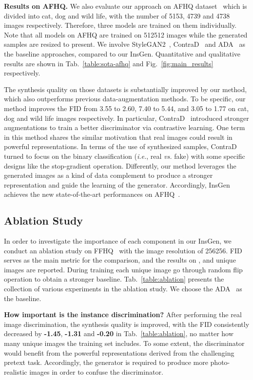 \documentclass{article}
\begin{document}
\noindent\textbf{Results on AFHQ.}
We also evaluate our approach on AFHQ dataset~\cite{choi2020starganv2} which is divided into cat, dog and wild life, with the number of 5153, 4739 and 4738 images respectively. Therefore, three models are trained on them individually. Note that all models on AFHQ are trained on 512512 images while the generated samples are resized to present. We involve StyleGAN2~\cite{Karras2019stylegan2}, ContraD~\cite{jeong2021training} and ADA~\cite{karras2020training} as the baseline approaches, compared to our InsGen.  Quantitative and qualitative results are shown in Tab.~\ref{table:sota-afhq} and Fig.~\ref{fig:main_results} respectively.


The synthesis quality on those datasets is substantially improved by our method, which also outperforms previous data-augmentation methods. To be specific, our method improves the FID from 3.55 to 2.60, 7.40 to 5.44, and 3.05 to 1.77 on cat, dog and wild life images  respectively. In particular, ContraD~\cite{jeong2021training} introduced stronger augmentations to train a better discriminator via contrastive learning. One term in this method shares the similar motivation that real images could result in powerful representations. In terms of the use of synthesized samples, ContraD turned to focus on the binary classification (\textit{i.e.}, real \textit{vs.} fake) with some specific designs like the stop-gradient operation. Differently, our method leverages the generated images as a kind of data complement to produce a stronger representation and guide the learning of the generator. Accordingly, InsGen achieves the new state-of-the-art performances on AFHQ~\cite{choi2020starganv2}.


\subsection{Ablation Study}\label{subsec:ablation}


In order to investigate the importance of each component in our InsGen, we conduct an ablation study on FFHQ~\cite{karras2019style} with the image resolution of 256256. FID serves as the main metric for the comparison, and the results on ,  and  unique images are reported. During training each unique image go through random flip operation to obtain a stronger baseline. Tab.~\ref{table:ablation} presents the collection of various experiments in the ablation study. We choose the ADA~\cite{karras2020training} as the baseline.


\noindent\textbf{How important is the instance discrimination?}
After performing the real image discrimination, the synthesis quality is improved, with the FID consistently decreased by \textbf{-1.45}, \textbf{-1.31} and \textbf{-0.20} in Tab.~\ref{table:ablation}, no matter how many unique images the training set includes. To some extent, the discriminator would benefit from the powerful representations derived from the challenging pretext task. Accordingly, the generator is required to produce more photo-realistic images in order to confuse the discriminator.
\end{document}
